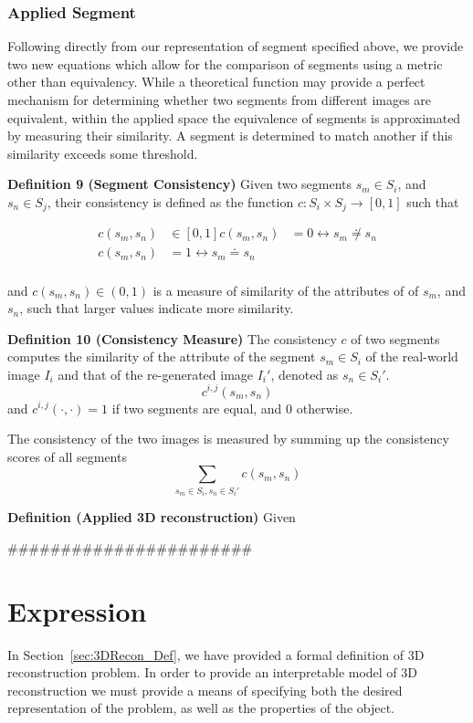 \subsubsection{Applied Segment}
Following directly from our representation of segment specified above, we provide two new equations which allow for the comparison of segments using a metric other than equivalency. While a theoretical function may provide a perfect mechanism for determining whether two segments from different images are equivalent, within the applied space the equivalence of segments is approximated by measuring their similarity. A segment is determined to match another if this similarity exceeds some threshold.

\textbf{Definition 9 (Segment Consistency)} Given two segments $s_m\in S_i$, and $s_n\in S_j$, their consistency is defined as the function $\mathit{c}: S_i\times S_j\rightarrow[0, 1]$ such that

\begin{align*}
\mathit{c}(s_m, s_n) &\in [0, 1]
\mathit{c}(s_m, s_n) &= 0 \leftrightarrow s_m \not\doteq s_n\\
\mathit{c}(s_m, s_n) &= 1 \leftrightarrow s_m \doteq s_n\\
\end{align*}

and $\mathit{c}(s_m, s_n)\in (0, 1)$ is a measure of similarity of the attributes of of $s_m$, and $s_n$, such that larger values indicate more similarity.

\textbf{Definition 10 (Consistency Measure)} The consistency $\mathit{c}$ of two segments computes the similarity of the attribute of the segment $s_m \in S_i$ of the real-world image $I_i$ and that of the re-generated image $I_i'$, denoted as $s_n\in S_i'$. \ie
$$\mathit{c}^{i,j}(s_m, s_n)$$
and $\mathit{c}^{i,j}(\cdot, \cdot)=1$ if two segments are equal, and 0 otherwise.

The consistency of the two images is measured by summing up the consistency scores of all segments
$$\sum_{s_m\in S_i, s_n\in S_i'}\mathit{c}(s_m, s_n)$$

\textbf{Definition (Applied 3D reconstruction)} Given 

#######################
\section{Expression}
\label{sec:3DRecon_Express}
In Section~\ref{sec:3DRecon_Def}, we have provided a formal definition of 3D reconstruction problem. In order to provide an interpretable model of 3D reconstruction we must provide a means of specifying both the desired representation of the problem, as well as the properties of the object.

